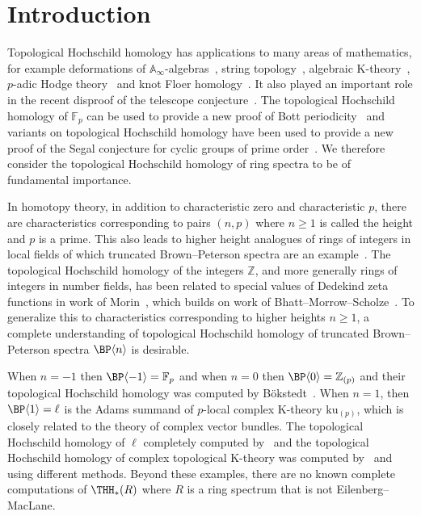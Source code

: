 
\section{Introduction}
Topological Hochschild homology has applications to many areas of mathematics, for example deformations of $\mathbb{A}_{\infty}$-algebras~\cite{Laz01}, string topology~\cite{CJ02}, algebraic K-theory~\cite{BHM93}, $p$-adic Hodge theory~\cite{BMS19}  and knot Floer homology~\cite{LOT15}. It also played an important role in the recent disproof of the telescope conjecture~\cite{BHLS23}. The topological Hochschild homology of $\mathbb{F}_p$ can be used to provide a new proof of Bott periodicity~\cite{HN20} and variants on topological Hochschild homology have been used to provide a new proof of the Segal conjecture for cyclic groups of prime order~\cites{HW21,AKZ25}. 
We therefore consider the topological Hochschild homology of ring spectra to be of fundamental importance. 

In homotopy theory, in addition to characteristic zero and characteristic $p$, there are characteristics corresponding to pairs $(n,p)$ where $n\ge 1$ is called the height and $p$ is a prime. This also leads to higher height analogues of rings of integers in local fields of which truncated Brown--Peterson spectra are an example~\cite{Rog25}. The topological Hochschild homology of the integers $\mathbb{Z}$, and more generally rings of integers in number fields, has been related to special values of Dedekind zeta functions in work of Morin~\cite{Mor24}, which builds on work of Bhatt--Morrow--Scholze~\cite{BMS19}. To generalize this to characteristics corresponding to higher heights $n\ge 1$, a complete understanding of topological Hochschild homology of truncated Brown--Peterson spectra $\BP\langle n\rangle$ is desirable.



When $n=-1$ then $\BP\langle -1\rangle=\mathbb{F}_p$ and when $n=0$ then $\BP\langle 0\rangle=\mathbb{Z}_{(p)}$ and their topological Hochschild homology was computed by B\"okstedt~\cite{Bok85}. When $n=1$, then $\BP\langle 1\rangle=\ell$ is the Adams summand of $p$-local complex K-theory $\mathrm{ku}_{(p)}$, which is closely related to the theory of complex vector bundles. The topological Hochschild homology of $\ell$ completely computed by~\cite{AHL10} and the topological Hochschild homology of complex topological K-theory was computed by~\cite{Lee22} and \cite{Cha25} using different methods. Beyond these examples, there are no known complete computations of $\THH_*(R)$ where $R$ is a ring spectrum that is not Eilenberg--MacLane.

